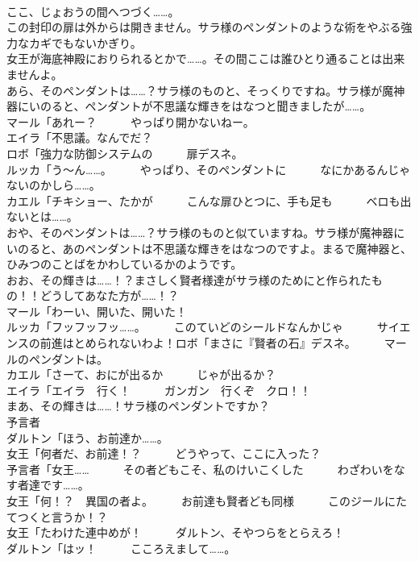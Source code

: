 \documentclass[8pt]{extreport}
\begin{document}
\begin{CJK}{UTF8}{min}
\\	ここ、じょおうの間へつづく……。	
\\	この封印の扉は外からは開きません。サラ様のペンダントのような術をやぶる強力なカギでもないかぎり。 
\\	女王が海底神殿におりられるとかで……。その間ここは誰ひとり通ることは出来ませんよ。	
\\	あら、そのペンダントは……？サラ様のものと、そっくりですね。サラ様が魔神器にいのると、ペンダントが不思議な輝きをはなつと聞きましたが……。	
\\	マール「あれー？　　　やっぱり開かないねー。	
\\	エイラ「不思議。なんでだ？	
\\	ロボ「強力な防御システムの　　　扉デスネ。	
\\	ルッカ「う～ん……。　　　やっぱり、そのペンダントに　　　なにかあるんじゃないのかしら……。	
\\	カエル「チキショー、たかが　　　こんな扉ひとつに、手も足も　　　ベロも出ないとは……。	
\\	おや、そのペンダントは……？サラ様のものと似ていますね。サラ様が魔神器にいのると、あのペンダントは不思議な輝きをはなつのですよ。まるで魔神器と、ひみつのことばをかわしているかのようです。	
\\	おお、その輝きは……！？まさしく賢者様達がサラ様のためにと作られたもの！！どうしてあなた方が……！？	
\\	マール「わーい、開いた、開いた！	
\\	ルッカ「フッフッフッ……。　　　このていどのシールドなんかじゃ　　　サイエンスの前進はとめられないわよ！ロボ「まさに『賢者の石』デスネ。　　　マールのペンダントは。	
\\	カエル「さーて、おにが出るか　　　じゃが出るか？	
\\	エイラ「エイラ　行く！　　　ガンガン　行くぞ　クロ！！	
\\	まあ、その輝きは……！サラ様のペンダントですか？	
\\	予言者
\\	ダルトン「ほう、お前達か……。	
\\	女王「何者だ、お前達！？　　　どうやって、ここに入った？	
\\	予言者「女王……　　　その者どもこそ、私のけいこくした　　　わざわいをなす者達です……。	
\\	女王「何！？　異国の者よ。　　　お前達も賢者ども同様　　　このジールにたてつくと言うか！？	
\\	女王「たわけた連中めが！　　　ダルトン、そやつらをとらえろ！	
\\	ダルトン「はッ！　　　こころえまして……。	

\end{CJK}
\end{document}
